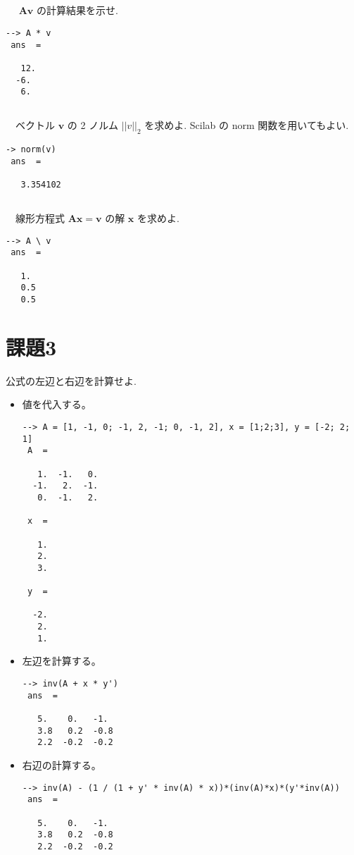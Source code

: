 \documentclass{scrartcl}
\begin{document}
\subsection{}
\label{sec:org53ab680}
　 \(\bm{A}\bm{v}\) の計算結果を示せ.\\
\begin{verbatim}
--> A * v
 ans  =

   12.
  -6.
   6.
\end{verbatim}

\subsection{}
\label{sec:orgb856c28}
　ベクトル \(\bm{v}\) の 2 ノルム \(||v||_2\) を求めよ. Scilab の norm 関数を用いてもよい.\\
\begin{verbatim}
-> norm(v)
 ans  =

   3.354102
\end{verbatim}
\subsection{}
\label{sec:orgfe9e232}
　線形方程式 \(\bm{A}\bm{x} = \bm{v}\) の解 \(\bm{x}\) を求めよ.\\
\begin{verbatim}
--> A \ v
 ans  =

   1.
   0.5
   0.5
\end{verbatim}

\section{課題3}
\label{sec:org2b89c28}
公式の左辺と右辺を計算せよ.\\
\begin{itemize}
\item 値を代入する。\\
\begin{verbatim}
--> A = [1, -1, 0; -1, 2, -1; 0, -1, 2], x = [1;2;3], y = [-2; 2; 1]
 A  = 

   1.  -1.   0.
  -1.   2.  -1.
   0.  -1.   2.

 x  = 

   1.
   2.
   3.

 y  = 

  -2.
   2.
   1.
\end{verbatim}
\item 左辺を計算する。\\
\begin{verbatim}
--> inv(A + x * y')
 ans  =

   5.    0.   -1. 
   3.8   0.2  -0.8
   2.2  -0.2  -0.2
\end{verbatim}
\item 右辺の計算する。\\
\begin{verbatim}
--> inv(A) - (1 / (1 + y' * inv(A) * x))*(inv(A)*x)*(y'*inv(A))
 ans  =

   5.    0.   -1. 
   3.8   0.2  -0.8
   2.2  -0.2  -0.2
\end{verbatim}
\end{itemize}
\end{document}
